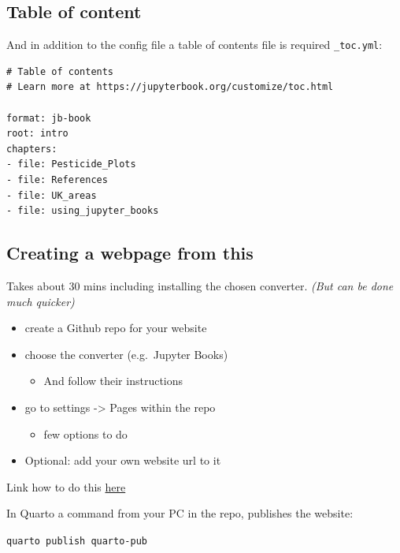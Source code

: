 \documentclass[
  letterpaper,
  DIV=11,
  numbers=noendperiod]{scrartcl}
\providecommand{\tightlist}{%
  \setlength{\itemsep}{0pt}\setlength{\parskip}{0pt}}\usepackage{longtable,booktabs,array}
\begin{document}
\hypertarget{table-of-content}{%
\subsection{Table of content}\label{table-of-content}}

And in addition to the config file a table of contents file is required
\texttt{\_toc.yml}:

\begin{verbatim}
# Table of contents
# Learn more at https://jupyterbook.org/customize/toc.html

format: jb-book
root: intro
chapters:
- file: Pesticide_Plots
- file: References
- file: UK_areas
- file: using_jupyter_books
\end{verbatim}

\hypertarget{creating-a-webpage-from-this}{%
\subsection{Creating a webpage from
this}\label{creating-a-webpage-from-this}}

Takes about 30 mins including installing the chosen converter.
\emph{(But can be done much quicker)}

\begin{itemize}
\tightlist
\item
  create a Github repo for your website
\item
  choose the converter (e.g.~Jupyter Books)

  \begin{itemize}
  \tightlist
  \item
    And follow their instructions
  \end{itemize}
\item
  go to settings -\textgreater{} Pages within the repo

  \begin{itemize}
  \tightlist
  \item
    few options to do
  \end{itemize}
\item
  Optional: add your own website url to it
\end{itemize}

Link how to do this
\href{https://kirenz.github.io/codelabs/codelabs/jupyter-book/\#7}{here}

In Quarto a command from your PC in the repo, publishes the website:

\texttt{quarto\ publish\ quarto-pub}
\end{document}
